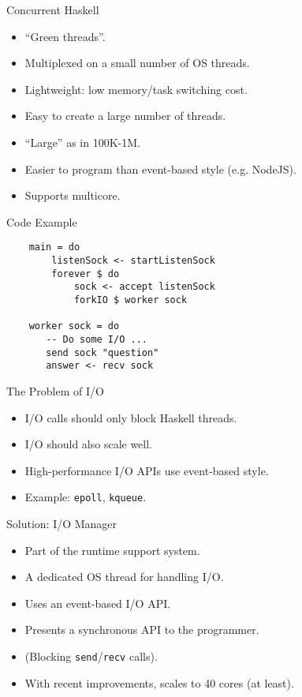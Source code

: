 \documentclass{beamer}
\begin{document}
\begin{frame}{Concurrent Haskell}
  \begin{itemize}
  \item ``Green threads''.
  \item Multiplexed on a small number of OS threads.
  \item Lightweight: low memory/task switching cost.
  \item Easy to create a large number of threads.
  \item ``Large'' as in 100K-1M.
  \item Easier to program than event-based style (e.g. NodeJS).
  \item Supports multicore.
  \end{itemize}
\end{frame}

\begin{frame}[fragile]{Code Example}
\begin{verbatim}
    main = do
        listenSock <- startListenSock
        forever $ do
            sock <- accept listenSock
            forkIO $ worker sock

    worker sock = do
       -- Do some I/O ...
       send sock "question"
       answer <- recv sock
\end{verbatim}
\end{frame}

\begin{frame}{The Problem of I/O}
  \begin{itemize}
  \item I/O calls should only block Haskell threads.
  \item I/O should also scale well.
  \item High-performance I/O APIs use event-based style.
  \item Example: \texttt{epoll}, \texttt{kqueue}.
  \end{itemize}
\end{frame}

\begin{frame}{Solution: I/O Manager}
  \begin{itemize}
  \item Part of the runtime support system.
  \item A dedicated OS thread for handling I/O.
  \item Uses an event-based I/O API.
  \item Presents a synchronous API to the programmer.
  \item (Blocking \texttt{send}/\texttt{recv} calls).
  \item With recent improvements, scales to 40 cores (at least).
  \end{itemize}
\end{frame}
\end{document}

